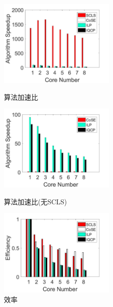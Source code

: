 \begin{figure}[htbp]
\centering
\begin{minipage}[t]{0.3\linewidth}
\centering
\includegraphics[width=2.25in]{figures/Multiple}
\caption{算法加速比}
\label{fig:Multiple}
\end{minipage}
\hfill
\begin{minipage}[t]{0.3\linewidth}
\centering
\includegraphics[width=2.25in]{figures/MultipleNoSCLS}
\caption{算法加速比(无SCLS)}
\label{fig:MultipleNoSCLS}
\end{minipage}
\hfill
\begin{minipage}[t]{0.3\linewidth}
\centering
\includegraphics[width=2.25in]{figures/Efficiency}
 \caption{效率}
 \label{fig:Efficiency}
\end{minipage}
\end{figure}


